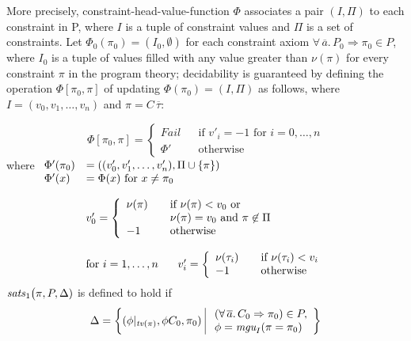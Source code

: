 \label{Phi0}
More precisely, constraint-head-value-function $\Phi$ associates a
pair $(I,\Pi)$ to each constraint in P, where $I$ is a tuple of
constraint values and $\Pi$ is a set of constraints. Let
$\Phi_0(\pi_0) = (I_0,\emptyset)$ for each constraint axiom
\mbox{$\forall\,\overline{a}.\,P_0 \Rightarrow\pi_0\in P$}, where
$I_0$ is a tuple of values filled with any value greater than
$\nu(\pi)$ for every constraint $\pi$ in the program theory;
decidability is guaranteed by defining the operation $\Phi[\pi_0,\pi]$
of updating $\Phi(\pi_0) = (I,\Pi)$ as follows, where $I = (v_0,
v_1,\ldots, v_n)$ and $\pi = C\,\overline{\tau}$:

\[ \Phi[\pi_0,\pi] = \left\{ \begin{array}{lll}
                                   \textit{Fail}  & & \text{if } v'_i = -1 \text{ for } i=0,\ldots,n \\
                                   \Phi'          & & \text{otherwise}
                             \end{array} \right.
\]
where $\begin{array}[t]{ll}
              \Phi' (\pi_0) &=  ((v'_0,v'_1,\ldots,v'_n), \Pi \cup \{ \pi \} ) \\
              \Phi' (x)     &= \Phi(x) \text{ for } x  \not= \pi_0
              \end{array}$

\[ \begin{array}{l}
   v'_0 = \left\{ \begin{array}{lll}
                \nu(\pi) & & \text{if } \nu(\pi) < v_0 \text{ or} \\
                          & & \nu(\pi) = v_0 \text{ and } \pi \not\in \Pi \\
                -1        & & \text{otherwise}
              \end{array} \right. \\ \\
   \text{for $i=1,\ldots,n$ }
   \hspace{.5cm} v'_i = \left\{ \begin{array}{lll}
                                           \nu(\tau_i) & & \text{if } \nu(\tau_i) < v_i \\
                                           -1           & & \text{otherwise}
                                        \end{array} \right. \\
   \end{array}
\]
$\textit{sats\/}_1\bigl(\pi,P,\Delta)$ is defined to hold if
\[ \Delta = \left\{ (\phi|_{{\it tv\/}(\pi)},\phi C_0,\pi_0)\,\,
					\begin{array}{|l}
	                  \,\,(\forall\,\overline{a}.\,C_0 \Rightarrow \pi_0) \in P,\\
                  		\,\,\phi = \mbox{\it mgu}_I(\pi = \pi_0) 
                  	\end{array} \right\}
  \]

